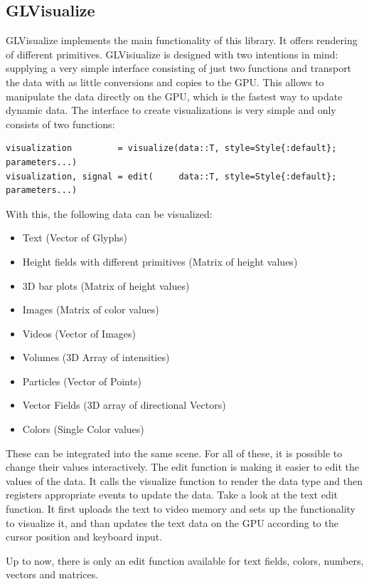 \subsection{GLVisualize}
GLVisualize implements the main functionality of this library.
It offers rendering of different primitives. GLVisiualize is designed with two intentions in mind: supplying a very simple interface consisting of just two functions and transport the data with as little conversions and copies to the GPU.
This allows to manipulate the data directly on the GPU, which is the fastest way to update dynamic data.
The interface to create visualizations is very simple and only consists of two functions:
\begin{lstlisting}
visualization 		  = visualize(data::T, style=Style{:default}; parameters...)
visualization, signal = edit(     data::T, style=Style{:default}; parameters...)
\end{lstlisting}

With this, the following data can be visualized:
\begin{itemize}
	\item Text (Vector of Glyphs)
	\item Height fields with different primitives (Matrix of height values)
	\item 3D bar plots (Matrix of height values)
	\item Images (Matrix of color values)
	\item Videos (Vector of Images)
	\item Volumes (3D Array of intensities)
	\item Particles (Vector of Points)
	\item Vector Fields (3D array of directional Vectors)
	\item Colors (Single Color values)
\end{itemize}

These can be integrated into the same scene. For all of these, it is possible to change their values interactively.
The edit function is making it easier to edit the values of the data.
It calls the visualize function to render the data type and then registers appropriate events to update the data.
Take a look at the text edit function. 
It first uploads the text to video memory and sets up the functionality to visualize it, and than updates the text data on the GPU according to the cursor position and keyboard input.

Up to now, there is only an edit function available for text fields, colors, numbers, vectors and matrices.


